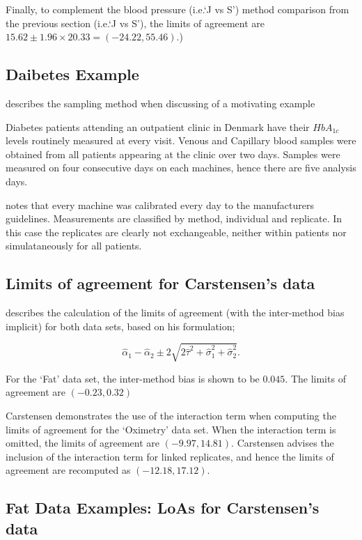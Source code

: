 \documentclass[12pt, a4paper]{report}
\theoremstyle{plain}
\theoremstyle{definition}
\theoremstyle{remark}
\begin{document}
	Finally, to complement the blood pressure (i.e.`J vs S') method comparison from the previous section (i.e.`J vs S'), the limits of agreement are $15.62 \pm 1.96 \times 20.33 = (-24.22, 55.46)$.)
	\newpage
		

	\subsection{Daibetes Example}
	\citet{BXC2008} describes the sampling method when discussing of a motivating example
	
	Diabetes patients attending an outpatient clinic in Denmark have their $HbA_{1c}$ levels routinely measured at every visit. Venous and Capillary blood samples were obtained from all patients appearing at the clinic over two days. Samples were measured on four consecutive days on each machines, hence there are five analysis days.
	
	\citet{BXC2008} notes that every machine was calibrated every day to  the manufacturers guidelines.
	Measurements are classified by method, individual and replicate. In this case the replicates are clearly not exchangeable, neither within patients nor simulataneously for all patients.
	


	\subsection{Limits of agreement for Carstensen's data}
	
	
	\citet{bxc2008} describes the calculation of the limits of agreement (with the inter-method bias implicit) for both data sets, based on his formulation;
	
	\[\hat{\alpha}_1 - \hat{\alpha}_2 \pm 2\sqrt{2\hat{\tau}^2 +\hat{\sigma}_1^2 +\hat{\sigma}_2^2 }.\]
	
	For the `Fat' data set, the inter-method bias is shown to be $0.045$. The limits of agreement are $(-0.23 , 0.32)$
	
	Carstensen demonstrates the use of the interaction term when computing the limits of agreement for the `Oximetry' data set. When the interaction term is omitted, the limits of agreement are $(-9.97, 14.81)$. Carstensen advises the inclusion of the interaction term for linked replicates, and hence the limits of agreement are recomputed as $(-12.18,17.12)$.
	
		
	\subsection{Fat Data Examples: LoAs for Carstensen's data}
	
\end{document}
